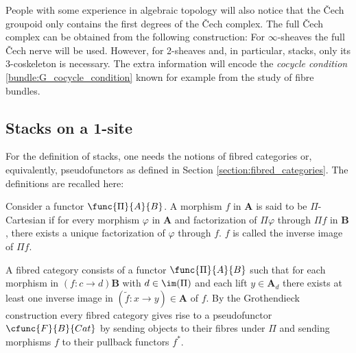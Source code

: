     People with some experience in algebraic topology will also notice that the \v{C}ech groupoid only contains the first degrees of the \v{C}ech complex. The full \v{C}ech complex can be obtained from the following construction:
    For $\infty$-sheaves the full \v{C}ech nerve will be used. However, for 2-sheaves and, in particular, stacks, only its 3-coskeleton is necessary. The extra information will encode the \textit{cocycle condition} \eqref{bundle:G_cocycle_condition} known for example from the study of fibre bundles.

\subsection{Stacks on a 1-site}

    For the definition of stacks, one needs the notions of fibred categories or, equivalently, pseudofunctors as defined in Section \ref{section:fibred_categories}. The definitions are recalled here:
    \begin{mdframed}[roundcorner=10pt, linecolor=green, linewidth=1pt]
        Consider a functor $\func{\Pi}{A}{B}$. A morphism $f$ in $\mathbf{A}$ is said to be $\Pi$-Cartesian if for every morphism $\varphi$ in $\mathbf{A}$ and factorization of $\Pi\varphi$ through $\Pi f$ in $\mathbf{B}$, there exists a unique factorization of $\varphi$ through $f$. $f$ is called the inverse image of $\Pi f$.

        A fibred category consists of a functor $\func{\Pi}{A}{B}$ such that for each morphism in $(f:c\rightarrow d)\mathbf{B}$ with $d\in\im(\Pi)$ and each lift $y\in\mathbf{A}_d$ there exists at least one inverse image in $(\widetilde{f}:x\rightarrow y)\in\mathbf{A}$ of $f$. By the Grothendieck construction every fibred category gives rise to a pseudofunctor $\cfunc{F}{B}{Cat}$ by sending objects to their fibres under $\Pi$ and sending morphisms $f$ to their pullback functors $f^*$.
    \end{mdframed}

